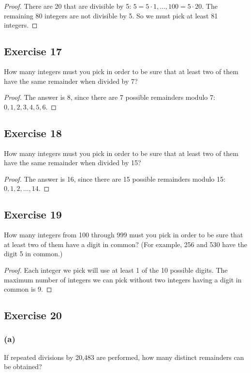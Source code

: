 \documentclass[14pt]{extarticle}
\begin{document}
\begin{proof}
     There are 20 that are divisible by 5: \(5 = 5 \cdot 1, \ldots, 100 = 5 \cdot 20\). The remaining 80 integers are
     not divisible by 5. So we must pick at least 81 integers.
\end{proof}

\subsection{Exercise 17}
How many integers must you pick in order to be sure that at least two of them have the same remainder when divided by 7?

\begin{proof}
     The answer is 8, since there are 7 possible remainders modulo 7: \(0, 1, 2, 3, 4, 5, 6\).
\end{proof}

\subsection{Exercise 18}
How many integers must you pick in order to be sure that at least two of them have the same remainder when divided by 15?

\begin{proof}
     The answer is 16, since there are 15 possible remainders modulo 15: \(0, 1, 2, \ldots, 14\).
\end{proof}

\subsection{Exercise 19}
How many integers from 100 through 999 must you pick in order to be sure that at least two of them have a digit in
common? (For example, 256 and 530 have the digit 5 in common.)

\begin{proof}
     Each integer we pick will use at least 1 of the 10 possible digits. The maximum number of integers we can pick without
     two integers having a digit in common is 9.
\end{proof}

\subsection{Exercise 20}
\subsubsection{(a)}
If repeated divisions by 20,483 are performed, how many distinct remainders can be obtained?
\end{document}
